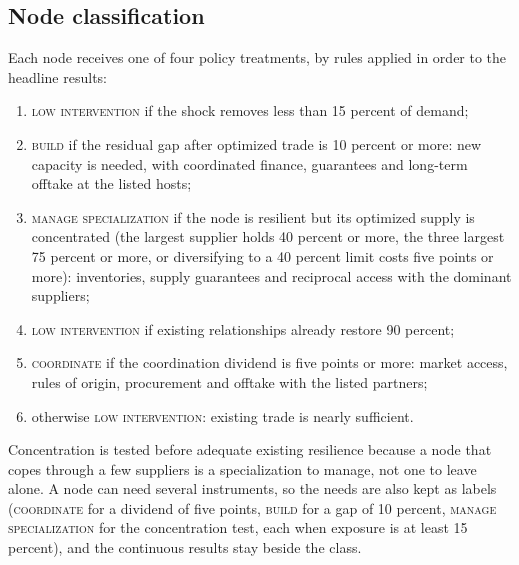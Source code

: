 \subsection{Node classification}
\label{subsec:aib_classes}

Each node receives one of four policy treatments, by rules applied in order to the headline results:
\begin{enumerate}[leftmargin=*,itemsep=1pt,topsep=2pt]
  \item \textsc{low intervention} if the shock removes less than 15 percent of demand;
  \item \textsc{build} if the residual gap after optimized trade is 10 percent or more: new capacity
  is needed, with coordinated finance, guarantees and long-term offtake at the listed hosts;
  \item \textsc{manage specialization} if the node is resilient but its optimized supply is
  concentrated (the largest supplier holds 40 percent or more, the three largest 75 percent or more,
  or diversifying to a 40 percent limit costs five points or more): inventories, supply guarantees and
  reciprocal access with the dominant suppliers;
  \item \textsc{low intervention} if existing relationships already restore 90 percent;
  \item \textsc{coordinate} if the coordination dividend is five points or more: market access, rules
  of origin, procurement and offtake with the listed partners;
  \item otherwise \textsc{low intervention}: existing trade is nearly sufficient.
\end{enumerate}
Concentration is tested before adequate existing resilience because a node that copes through a few
suppliers is a specialization to manage, not one to leave alone. A node can need several instruments,
so the needs are also kept as labels (\textsc{coordinate} for a dividend of five points, \textsc{build}
for a gap of 10 percent, \textsc{manage specialization} for the concentration test, each when exposure
is at least 15 percent), and the continuous results stay beside the class.

